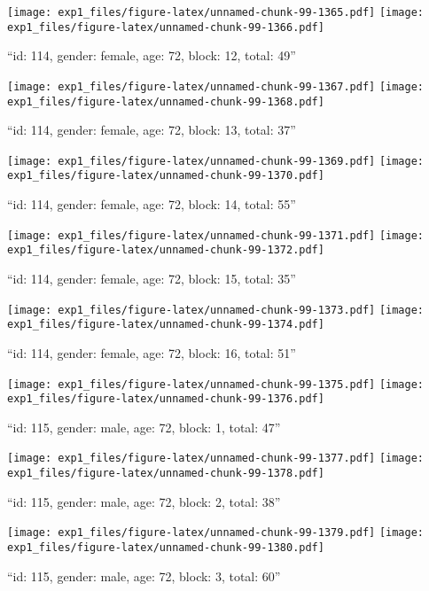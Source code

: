 \documentclass[,]{article}
\begin{document}
\texttt{[image: exp1\_files/figure-latex/unnamed-chunk-99-1365.pdf]}
\texttt{[image: exp1\_files/figure-latex/unnamed-chunk-99-1366.pdf]}

\newpage
[1] 

``id: 114, gender: female, age: 72, block: 12, total: 49''

\texttt{[image: exp1\_files/figure-latex/unnamed-chunk-99-1367.pdf]}
\texttt{[image: exp1\_files/figure-latex/unnamed-chunk-99-1368.pdf]}

\newpage
[1] 

``id: 114, gender: female, age: 72, block: 13, total: 37''

\texttt{[image: exp1\_files/figure-latex/unnamed-chunk-99-1369.pdf]}
\texttt{[image: exp1\_files/figure-latex/unnamed-chunk-99-1370.pdf]}

\newpage
[1] 

``id: 114, gender: female, age: 72, block: 14, total: 55''

\texttt{[image: exp1\_files/figure-latex/unnamed-chunk-99-1371.pdf]}
\texttt{[image: exp1\_files/figure-latex/unnamed-chunk-99-1372.pdf]}

\newpage
[1] 

``id: 114, gender: female, age: 72, block: 15, total: 35''

\texttt{[image: exp1\_files/figure-latex/unnamed-chunk-99-1373.pdf]}
\texttt{[image: exp1\_files/figure-latex/unnamed-chunk-99-1374.pdf]}

\newpage
[1] 

``id: 114, gender: female, age: 72, block: 16, total: 51''

\texttt{[image: exp1\_files/figure-latex/unnamed-chunk-99-1375.pdf]}
\texttt{[image: exp1\_files/figure-latex/unnamed-chunk-99-1376.pdf]}

\newpage
[1] 

``id: 115, gender: male, age: 72, block: 1, total: 47''

\texttt{[image: exp1\_files/figure-latex/unnamed-chunk-99-1377.pdf]}
\texttt{[image: exp1\_files/figure-latex/unnamed-chunk-99-1378.pdf]}

\newpage
[1] 

``id: 115, gender: male, age: 72, block: 2, total: 38''

\texttt{[image: exp1\_files/figure-latex/unnamed-chunk-99-1379.pdf]}
\texttt{[image: exp1\_files/figure-latex/unnamed-chunk-99-1380.pdf]}

\newpage
[1] 

``id: 115, gender: male, age: 72, block: 3, total: 60''
\end{document}
